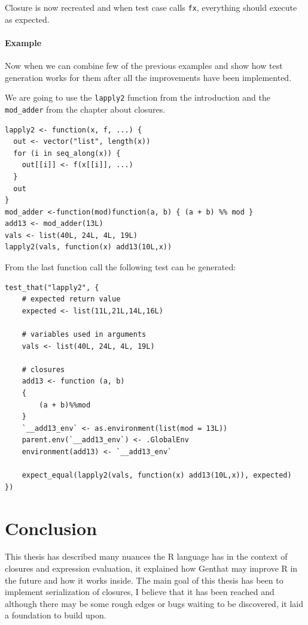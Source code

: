 \documentclass[thesis=B,english]{FITthesis}[2012/10/20]
\begin{document}
Closure is now recreated and when test case calls \verb|fx|, everything should execute as expected.

\subsubsection{Example}
Now when we can combine few of the previous examples and show how test generation works for them after all the improvements have been implemented. 

We are going to use the \verb|lapply2| function from the introduction and the \verb|mod_adder| from the chapter about closures.

\begin{verbatim}
lapply2 <- function(x, f, ...) {
  out <- vector("list", length(x))
  for (i in seq_along(x)) {
    out[[i]] <- f(x[[i]], ...)
  }
  out
}
mod_adder <-function(mod)function(a, b) { (a + b) %% mod }
add13 <- mod_adder(13L)
vals <- list(40L, 24L, 4L, 19L)  
lapply2(vals, function(x) add13(10L,x))
\end{verbatim}

From the last function call the following test can be generated:

\begin{verbatim}
test_that("lapply2", {                   
    # expected return value   
    expected <- list(11L,21L,14L,16L)        
    
    # variables used in arguments                     
    vals <- list(40L, 24L, 4L, 19L)
    
    # closures                     
    add13 <- function (a, b)
    {
        (a + b)%%mod
    }
    `__add13_env` <- as.environment(list(mod = 13L))
    parent.env(`__add13_env`) <- .GlobalEnv
    environment(add13) <- `__add13_env`
    
    expect_equal(lapply2(vals, function(x) add13(10L,x)), expected)
})                               
\end{verbatim}

\chapter{Conclusion}
This thesis has described many nuances the R language has in the context of closures and expression evaluation, it explained how Genthat may improve R in the future and how it works inside. The main goal of this thesis has been to implement serialization of closures, I believe that it has been reached and although there may be some rough edges or bugs waiting to be discovered, it laid a foundation to build upon. 
\end{document}
